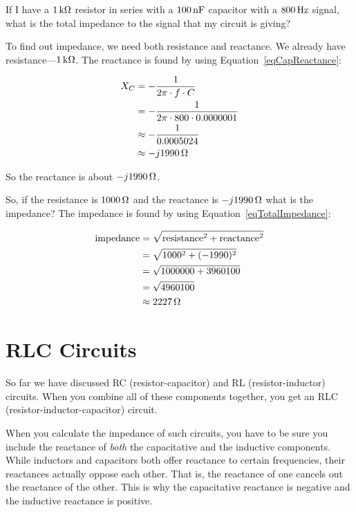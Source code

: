 \begin{exampleprob}
If I have a $1\,\si{\kilo\ohm}$ resistor in series with a $100\,\si{\nano\farad}$ capacitor with a $800\,\si{\hertz}$ signal, what is the total impedance to the signal that my circuit is giving?

To find out impedance, we need both resistance and reactance.
We already have resistance---$1\,\si{\kilo\ohm}$.
The reactance is found by using Equation~\ref{eqCapReactance}:

\begin{align*}
X_C &= -\frac{1}{2\pi\cdot f\cdot C} \\
    &= -\frac{1}{2\pi\cdot 800 \cdot 0.0000001} \\
    &\approx -\frac{1}{0.0005024} \\
    &\approx -j1990\,\si{\ohm}
\end{align*}

So the reactance is about $-j1990\,\si{\ohm}$.

So, if the resistance is $1000\,\si{\ohm}$ and the reactance is $-j1990\,\si{\ohm}$ what is the impedance?
The impedance is found by using Equation~\ref{eqTotalImpedance}:

\begin{align*}
\textrm{impedance} &= \sqrt{\textrm{resistance}^2 + \textrm{reactance}^2} \\
 &= \sqrt{1000^2 + (-1990)^2} \\
 &= \sqrt{1000000 + 3960100} \\
 &= \sqrt{4960100} \\
 &\approx 2227\,\si{\ohm}
\end{align*}

\end{exampleprob}


\section{RLC Circuits}

So far we have discussed RC (resistor-capacitor) and RL (resistor-inductor) circuits.
When you combine all of these components together, you get an RLC (resistor-inductor-capacitor) circuit.

When you calculate the impedance of such circuits, you have to be sure you include the reactance of \emph{both} the capacitative and the inductive components.
While inductors and capacitors both offer reactance to certain frequencies, their reactances actually oppose each other.
That is, the reactance of one cancels out the reactance of the other.
This is why the capacitative reactance is negative and the inductive reactance is positive.

